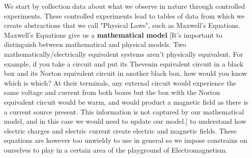 \documentclass{report}
\begin{document}
We start by collection data about what we observe in nature through controlled experiments. These controlled experiments lead to tables of data from which we create abstractions that we call "Physical Laws", such as Maxwell's Equations. Maxwell's Equations give us a \textbf{mathematical model} [It's important to distinguish between mathematical and physical models. Two mathematically/electrically equivalent systems aren't physically equivalent. 
For example, if you take a circuit and put its Thevenin equivalent circuit in a black box and its Norton equivalent circuit in another black box, how would you know which is which? At their terminals, any external circuit would experience the same voltage and current from both boxes but the box with the Norton equivalent circuit would be warm, and would product a magnetic field as there is a current source present. This information is not captured by our mathematical model, and in this case we would need to update our model.] to understand how electric charges and electric current create electric and magnetic fields. These equations are however too unwieldy to use in general so we impose constrains on ourselves to play in a certain area of the playground of Electromagnetism. 




\end{document}

